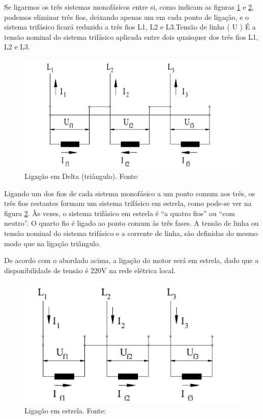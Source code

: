 Se ligarmos os três sistemas monofásicos entre si, como indicam as figuras \ref{fig:TRIANGULO} e \ref{fig:ESTRELA}, 
podemos eliminar três fios, deixando apenas um em cada ponto de ligação, e o sistema trifásico ficará reduzido a três 
fios L1, L2 e L3.Tensão de linha ( U ) É a tensão nominal do sistema trifásico aplicada entre dois quaisquer dos
três fios L1, L2 e L3.

\begin{figure}[!ht]
\centering
\includegraphics[scale=0.8]{figuras/TRIANGULO.png}
\caption{Ligação em Delta (triângulo). Fonte:\cite{WEG_catalogo}}
\label{fig:TRIANGULO}
\end{figure}

Ligando um dos fios de cada sistema monofásico a um ponto comum aos três, os três fios restantes formam um sistema 
trifásico em estrela, como pode-se ver na figura  \ref{fig:ESTRELA}. Às vezes, o sistema trifásico em estrela é “a quatro fios” 
ou “com neutro”. O quarto fio é ligado ao ponto comum às três fases. A tensão de linha ou tensão nominal do sistema trifásico e
a corrente de linha, são definidas do mesmo modo que na ligação triângulo.\cite{WEG_catalogo}

De acordo com o abordado acima, a ligação do motor será em estrela, dado que a disponibilidade de tensão é 220V na rede 
elétrica local.

\begin{figure}[h!]
\centering
\includegraphics[scale=0.8]{figuras/ESTRELA.png}
\caption{Ligação em estrela. Fonte:\cite{WEG_catalogo}}
\label{fig:ESTRELA}
\end{figure}

